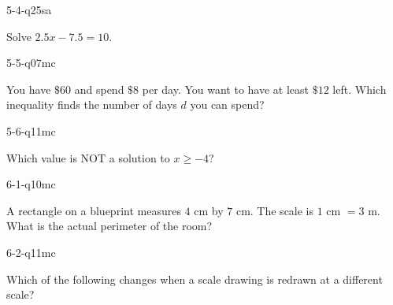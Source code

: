 \begin{practiceQuestion}{5-4-q25}{sa}
\begin{questionText}
Solve $2.5x - 7.5 = 10$.
\end{questionText}
\end{practiceQuestion}

\begin{practiceQuestion}{5-5-q07}{mc}
\begin{questionText}
You have $\$60$ and spend $\$8$ per day. You want to have at least $\$12$ left. Which inequality finds the number of days $d$ you can spend?
\end{questionText}
\end{practiceQuestion}

\begin{practiceQuestion}{5-6-q11}{mc}
\begin{questionText}
Which value is NOT a solution to $x \geq -4$?
\end{questionText}
\end{practiceQuestion}

\begin{practiceQuestion}{6-1-q10}{mc}
\begin{questionText}
A rectangle on a blueprint measures $4$ cm by $7$ cm. The scale is $1$ cm $= 3$ m. What is the actual perimeter of the room?
\end{questionText}
\end{practiceQuestion}

\begin{practiceQuestion}{6-2-q11}{mc}
\begin{questionText}
Which of the following changes when a scale drawing is redrawn at a different scale?
\end{questionText}
\end{practiceQuestion}

